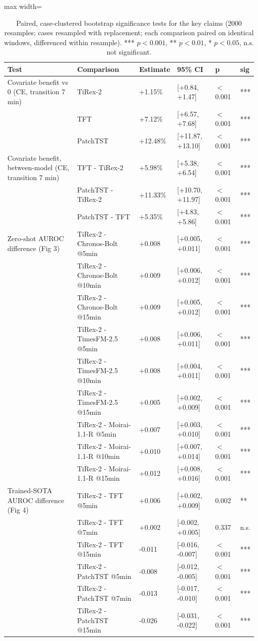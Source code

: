 \documentclass[10pt]{article}
\begin{document}
\begin{table}[H]\centering\footnotesize
\caption{Paired, case-clustered bootstrap significance tests for the key claims (2000 resamples; cases resampled with replacement; each comparison paired on identical windows, differenced within resample). *** $p<0.001$, ** $p<0.01$, * $p<0.05$, n.s. not significant.}
\begin{adjustbox}{max width=\textwidth}
\begin{tabular}{llllll}
\toprule
\textbf{Test} & \textbf{Comparison} & \textbf{Estimate} & \textbf{95\% CI} & \textbf{p} & \textbf{sig} \\
\midrule
Covariate benefit vs 0 (CE, transition 7 min) & TiRex-2 & +1.15\% & [+0.84, +1.47] & $<$0.001 & *** \\
 & TFT & +7.12\% & [+6.57, +7.68] & $<$0.001 & *** \\
 & PatchTST & +12.48\% & [+11.87, +13.10] & $<$0.001 & *** \\
Covariate benefit, between-model (CE, transition 7 min) & TFT - TiRex-2 & +5.98\% & [+5.38, +6.54] & $<$0.001 & *** \\
 & PatchTST - TiRex-2 & +11.33\% & [+10.70, +11.97] & $<$0.001 & *** \\
 & PatchTST - TFT & +5.35\% & [+4.83, +5.86] & $<$0.001 & *** \\
Zero-shot AUROC difference (Fig 3) & TiRex-2 - Chronos-Bolt @5min & +0.008 & [+0.005, +0.011] & $<$0.001 & *** \\
 & TiRex-2 - Chronos-Bolt @10min & +0.009 & [+0.006, +0.012] & $<$0.001 & *** \\
 & TiRex-2 - Chronos-Bolt @15min & +0.009 & [+0.005, +0.012] & $<$0.001 & *** \\
 & TiRex-2 - TimesFM-2.5 @5min & +0.008 & [+0.006, +0.011] & $<$0.001 & *** \\
 & TiRex-2 - TimesFM-2.5 @10min & +0.008 & [+0.004, +0.011] & $<$0.001 & *** \\
 & TiRex-2 - TimesFM-2.5 @15min & +0.005 & [+0.002, +0.009] & $<$0.001 & *** \\
 & TiRex-2 - Moirai-1.1-R @5min & +0.007 & [+0.003, +0.010] & $<$0.001 & *** \\
 & TiRex-2 - Moirai-1.1-R @10min & +0.010 & [+0.007, +0.014] & $<$0.001 & *** \\
 & TiRex-2 - Moirai-1.1-R @15min & +0.012 & [+0.008, +0.016] & $<$0.001 & *** \\
Trained-SOTA AUROC difference (Fig 4) & TiRex-2 - TFT @5min & +0.006 & [+0.002, +0.009] & 0.002 & ** \\
 & TiRex-2 - TFT @7min & +0.002 & [-0.002, +0.005] & 0.337 & n.s. \\
 & TiRex-2 - TFT @15min & -0.011 & [-0.016, -0.007] & $<$0.001 & *** \\
 & TiRex-2 - PatchTST @5min & -0.008 & [-0.012, -0.005] & $<$0.001 & *** \\
 & TiRex-2 - PatchTST @7min & -0.013 & [-0.017, -0.010] & $<$0.001 & *** \\
 & TiRex-2 - PatchTST @15min & -0.026 & [-0.031, -0.022] & $<$0.001 & *** \\
\bottomrule
\end{tabular}
\end{adjustbox}
\end{table}
\end{document}

